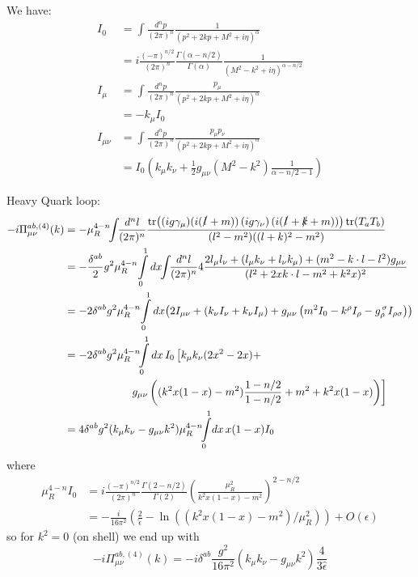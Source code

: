 We have\cite[(A.18)-(A.20)]{Pokorski}:
\begin{align}
I_0 &= \int\!\frac{d^np}{(2\pi)^n} \frac 1 {(p^2+2kp+M^2+i\eta)^\alpha}\\
 &= i\frac{(-\pi)^{n/2}}{(2\pi)^n} \frac{\Gamma(\alpha-n/2)}{\Gamma(\alpha)} \frac 1 {(M^2-k^2+i\eta)^{\alpha-n/2}}\\
I_\mu &= \int\!\frac{d^np}{(2\pi)^n} \frac {p_\mu} {(p^2+2kp+M^2+i\eta)^\alpha}\\
 &= - k_\mu I_0\\
I_{\mu\nu}&= \int\!\frac{d^np}{(2\pi)^n} \frac {p_\mu p_\nu} {(p^2+2kp+M^2+i\eta)^\alpha}\\
 &= I_0\left(k_\mu k_\nu + \frac 1 2 g_{\mu\nu}(M^2-k^2)\frac 1 {\alpha-n/2-1}\right)
\end{align}

Heavy Quark loop:
\begin{align}
-i\Pi_{\mu\nu}^{ab,(4)}(k) &=  -\mu_R^{4-n}\!\!\int\!\!\frac{d^nl}{(2\pi)^n} \frac{\tr\!\left((ig\gamma_\mu)(i(\slashed l + m))\left(ig\gamma_\nu\right)(i(\slashed l + \slashed k + m))\right)\tr(T_aT_b)}{(l^2-m^2)((l+k)^2-m^2)}\\
 &= -\frac {\delta^{ab}}{2}g^2\mu_R^{4-n}\!\int\limits_0^1dx\!\!\int\!\!\frac{d^nl}{(2\pi)^n} 4\frac{2l_\mu l_\nu+(l_\mu k_\nu+l_\nu k_\mu)+(m^2-k\cdot l-l^2)g_{\mu\nu}}{(l^2+2xk\cdot l-m^2+k^2 x)^2}\\
 &= -2\delta^{ab}g^2\mu_R^{4-n}\!\int\limits_0^1dx\!\left(2I_{\mu\nu}+\left(k_\nu I_\nu + k_\nu I_\mu\right) + g_{\mu\nu}\left(m^2I_0-k^\rho I_\rho - g_\rho^{\,\sigma}I_{\rho\sigma}\right)\right)\\
 &= -2\delta^{ab}g^2\mu_R^{4-n}\!\!\int\limits_0^1dx\,I_0\left[k_\mu k_\nu(2x^2-2x)+\right.\nonumber\\
 &\hspace{60pt}\left.g_{\mu\nu}\left((k^2x(1-x)-m^2)\frac{1-n/2}{1-n/2}+m^2+k^2x(1-x)\right)\right]\\
 &= 4\delta^{ab}g^2(k_\mu k_\nu - g_{\mu\nu}k^2) \mu_R^{4-n}\!\!\int\limits_0^1\!dx\,x(1-x)I_0
\end{align}
where
\begin{align}
\mu_R^{4-n}I_0 &= i\frac{(-\pi)^{n/2}}{(2\pi)^n} \frac{\Gamma(2-n/2)}{\Gamma(2)} \left(\frac {\mu_R^2} {k^2x(1-x)-m^2}\right)^{2-n/2}\\
 &= -\frac i {16\pi^2}\left(\frac 2 {\hat\epsilon}-\ln((k^2x(1-x)-m^2)/\mu_R^2)\right) + O(\epsilon)
\end{align}
so for $k^2=0$ (on shell) we end up with
\begin{equation}
-i\Pi_{\mu\nu}^{ab,(4)}(k) = -i\delta^{ab}\frac{g^2}{16\pi^2}(k_\mu k_\nu - g_{\mu\nu}k^2) \frac 4 {3\hat\epsilon}
\end{equation}

